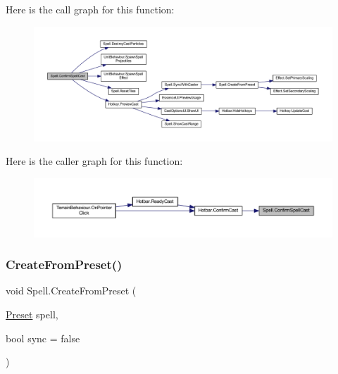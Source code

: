 Here is the call graph for this function\+:
\nopagebreak
\begin{figure}[H]
\begin{center}
\leavevmode
\includegraphics[width=350pt]{class_spell_a89146285dc4dadf46398da2683bcc869_cgraph}
\end{center}
\end{figure}
Here is the caller graph for this function\+:
\nopagebreak
\begin{figure}[H]
\begin{center}
\leavevmode
\includegraphics[width=350pt]{class_spell_a89146285dc4dadf46398da2683bcc869_icgraph}
\end{center}
\end{figure}
\mbox{\label{class_spell_aee08370358e033af2bf7e0c4c2f2b2bd}} 
\subsubsection{\texorpdfstring{CreateFromPreset()}{CreateFromPreset()}}
{\footnotesize\ttfamily void Spell.\+Create\+From\+Preset (\begin{DoxyParamCaption}\item[{\mbox{\hyperlink{class_spell_a5520e850e7000a6156b3456672b72ed1}{Preset}}}]{spell,  }\item[{bool}]{sync = {\ttfamily false} }\end{DoxyParamCaption})}

